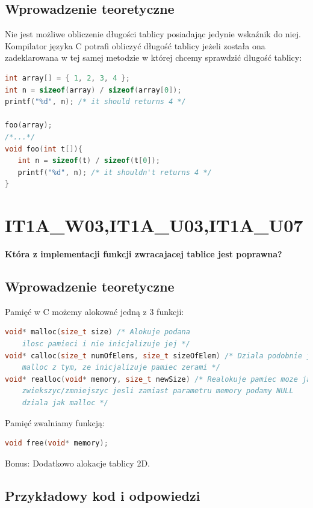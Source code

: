 \subsection{Wprowadzenie teoretyczne}
Nie jest możliwe obliczenie długości tablicy posiadając jedynie wskaźnik do niej.\\
Kompilator języka C potrafi obliczyć długość tablicy jeżeli została ona zadeklarowana w tej samej metodzie w której chcemy sprawdzić długość tablicy:
\begin{lstlisting}[language=c]
int array[] = { 1, 2, 3, 4 };
int n = sizeof(array) / sizeof(array[0]);
printf("%d", n); /* it should returns 4 */

foo(array);
/*...*/
void foo(int t[]){
   int n = sizeof(t) / sizeof(t[0]);
   printf("%d", n); /* it shouldn't returns 4 */
}
\end{lstlisting}


\section{IT1A\_W03,IT1A\_U03,IT1A\_U07}
\textbf{Która z implementacji funkcji zwracajacej tablice jest poprawna?}

\subsection{Wprowadzenie teoretyczne}

Pamięć w C możemy alokować jedną z 3 funkcji:
\begin{lstlisting}[language=c]
void* malloc(size_t size) /* Alokuje podana 
	ilosc pamieci i nie inicjalizuje jej */
void* calloc(size_t numOfElems, size_t sizeOfElem) /* Dziala podobnie jak 
	malloc z tym, ze inicjalizuje pamiec zerami */
void* realloc(void* memory, size_t newSize) /* Realokuje pamiec moze ja 
	zwiekszyc/zmniejszyc jesli zamiast parametru memory podamy NULL
	dziala jak malloc */
\end{lstlisting}

Pamięć zwalniamy funkcją:
\begin{lstlisting}[language=c]
void free(void* memory);
\end{lstlisting}

Bonus: Dodatkowo alokacje tablicy 2D.
	
\subsection{Przykładowy kod i odpowiedzi}
	
